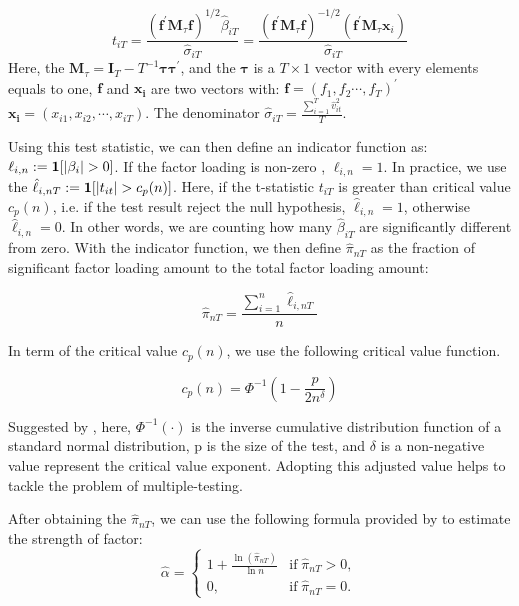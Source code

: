 \[t_{i T}=\frac{\left(\bm{f}^{\prime} \bm{M}_{\tau} \bm{f}\right)^{1 / 2} \hat{\beta}_{i T}}{\hat{\sigma}_{i T}}=\frac{\left(\bm{f}^{\prime} \bm{M}_{\tau} \bm{f}\right)^{-1 / 2}\left(\bm{f}^{\prime} \bm{M}_{\tau} \bm{x}_{i}\right)}{\hat{\sigma}_{i T}} \tag{3} \label{test_statistic} \]
Here, the $\bm{M}_{\tau} = \bm{I}_T - T^{-1}\bm{\tau}\bm{\tau^\prime}$, and the $\bm{\tau}$ is a $T\times 1$ vector with every elements equals to one, $\bm{f}$ and $\bm{x_i}$ are two vectors with: $\bm{f} = (f_1, f_2 \cdots, f_T)^{\prime}$   $\bm{x_i} = (x_{i1}, x_{i2}, \cdots, x_{iT})$.
The denominator $\hat{\sigma}_{iT} = \frac{\sum_{i=1}^{T} \hat{v}^2_{it} }{T}$.

Using this test statistic, we can then define an indicator function as: $\ell_{i,n} := {\bf1}[|\beta_i|>0]$.
If the factor loading is non-zero , $\ell_{i,n} = 1$.
In practice, we use the $\hat{\ell}_{i,nT} := {\bf1}[|t_{it}|>c_p(n)]$.
Here, if the t-statistic $t_{iT}$ is greater than critical value $c_p(n)$, i.e. if the test result reject the null hypothesis, $\hat{\ell}_{i,n} = 1$, otherwise $\hat{\ell}_{i,n} = 0$.
In other words, we are counting how many $\hat{\beta}_{iT}$ are significantly different from zero.
With the indicator function, we then define $\hat{\pi}_{nT}$ as the fraction of significant factor loading amount to the total factor loading amount:

\[  \hat{\pi}_{nT} = \frac{\sum_{i=1}^n \hat{\ell}_{i,nT}}{n} \tag{4} \label{pi_function} \]


In term of the critical value $c_p(n)$, we use the following critical value function.

\[   c_p(n) = \Phi^{-1}(1 - \frac{p}{2n^\delta})   \tag{5} \label{critical_value_function} \]

Suggested by , here, $\Phi^{-1}(\cdot)$ is the inverse cumulative distribution function of a standard normal distribution, p is the size of the test, and $\delta$ is a non-negative value represent the critical value exponent. 
Adopting this adjusted value helps to tackle the problem of multiple-testing.


After obtaining the $\hat{\pi}_{nT}$, we can use the following formula provided by  to estimate the strength of factor:
\[ \hat{\alpha} = \begin{cases}
1+\frac{\ln(\hat{\pi}_{nT})}{\ln n} & \text{if}\; \hat{\pi}_{nT} > 0,\\
0, & \text{if}\; \hat{\pi}_{nT} = 0.
	\end{cases} \tag{6} \label{estimation_method} \]

